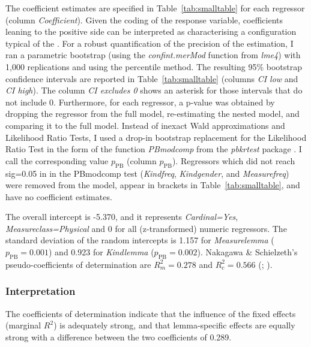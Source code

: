 The coefficient estimates are specified in Table~\ref{tab:smalltable} for each regressor (column \textit{Coefficient}).
Given the coding of the response variable, coefficients leaning to the positive side can be interpreted as characterising a configuration typical of the \PGCd.
For a robust quantification of the precision of the estimation, I ran a parametric bootstrap (using the \mbox{\textit{confint.merMod}} function from \textit{lme4}) with 1,000 replications and using the percentile method.
The resulting 95\% bootstrap confidence intervals are reported in Table~\ref{tab:smalltable} (columns \textit{CI low} and \textit{CI high}).
The column \textit{CI excludes 0} shows an asterisk for those intervals that do not include 0.
Furthermore, for each regressor, a p-value was obtained by dropping the regressor from the full model, re-estimating the nested model, and comparing it to the full model.
Instead of inexact Wald approximations and Likelihood Ratio Tests, I used a drop-in bootstrap replacement for the Likelihood Ratio Test in the form of the function \textit{PBmodcomp} from the \textit{pbkrtest} package \citep{HalekohHojsgaard2014}.
I call the corresponding value $p_{\text{PB}}$ (column $p_{\text{PB}}$).
Regressors which did not reach sig=0.05 in in the PBmodcomp test (\textit{Kindfreq}, \textit{Kindgender}, and \textit{Measurefreq}) were removed from the model, appear in brackets in Table~\ref{tab:smalltable}, and have no coefficient estimates.

The overall intercept is -5.370, and it represents \textit{Cardinal=Yes}, \textit{Measureclass=Physical} and 0 for all (z-transformed) numeric regressors.
The standard deviation of the random intercepts is 1.157 for \textit{Measurelemma} ($p_{\text{PB}}=0.001$) and 0.923 for \textit{Kindlemma} ($p_{\text{PB}}=0.002$).
Nakagawa \& Schielzeth's pseudo-coefficients of determination are $R_m^2=0.278$ and $R^2_c=0.566$ (\citealp{Gries2015}; \citealp{NakagawaSchielzeth2013}).

\subsubsection{Interpretation}

The coefficients of determination indicate that the influence of the fixed effects (marginal $R^2$) is adequately strong, and that lemma-specific effects are equally strong with a difference between the two coefficients of 0.289.

